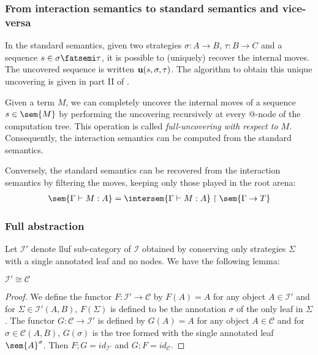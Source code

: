 \subsubsection{From interaction semantics to standard semantics and vice-versa}

In the standard semantics, given two strategies $\sigma : A \rightarrow B$, $\tau : B \rightarrow C$ and
a sequence $s \in \sigma \fatsemi \tau$, it is possible to (uniquely) recover the internal moves. The uncovered sequence is written
${\bf u}(s, \sigma, \tau)$. The algorithm to obtain this unique uncovering is given in part II of \cite{hylandong_pcf}.

Given a term $M$, we can completely uncover the internal moves of a sequence $s\in\sem{M}$
by performing the uncovering recursively at every @-node of the computation tree.
This operation is called \emph{full-uncovering with respect to $M$}.
Consequently, the interaction semantics can be computed from the standard semantics.

Conversely, the standard semantics can be recovered from the
interaction semantics by filtering the moves, keeping only those
played in the root arena:
\begin{eqnarray}
 \sem{\Gamma \vdash M : A} = \intersem{\Gamma \vdash M : A} \upharpoonright \sem{\Gamma \rightarrow T} \label{eqn:int_std_gamsem}
\end{eqnarray}


\subsubsection{Full abstraction}

Let $\mathcal{I'}$ denote lluf sub-category of $\mathcal{I}$ obtained by conserving only strategies $\Sigma$ with a single
annotated leaf and no nodes. We have the following lemma:
\begin{lem}
$\mathcal{I'} \cong \mathcal{C}$
\end{lem}
\begin{proof}
We define the functor $F:\mathcal{I'} \rightarrow \mathcal{C}$
by $F(A) = A$ for any object $A\in \mathcal{I'}$ and for $\Sigma \in \mathcal{I'}(A,B)$,
$F(\Sigma)$ is defined to be the annotation $\sigma$ of the only leaf in $\Sigma$.
The functor $G:\mathcal{C} \rightarrow \mathcal{I'}$ is defined by
$G(A) = A$ for any object $A\in \mathcal{C}$ and for $\sigma \in \mathcal{C}(A,B)$,
$G(\sigma)$ is the tree formed with the single annotated leaf $\sem{A}^\sigma$.
Then $F;G =id_{\mathcal{I'}}$ and $G;F =id_{\mathcal{C}}$.
\end{proof}

